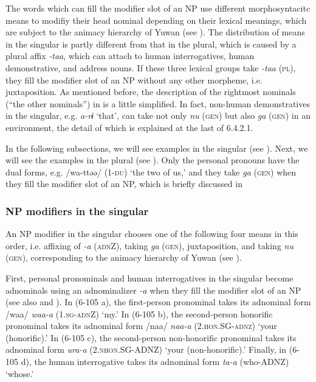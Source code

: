 The words which can fill the modifier slot of an NP use different morphosyntacitc means to modifiy their head nominal depending on their lexical meanings, which are subject to the animacy hierarchy of Yuwan (see ). The distribution of means in the singular is partly different from that in the plural, which is caused by a plural affix \textit{{}-taa}, which can attach to human interrogatives, human demonstrative, and address nouns. If these three lexical groups take \textit{{}-taa} (\textsc{pl}), they fill the modifier slot of an NP without any other morpheme, i.e. juxtaposition. As mentioned before, the description of the rightmost nominals (“the other nominals”) in  is a little simplified. In fact, non-human demonstratives in the singular, e.g. \textit{a-rɨ} ‘that’, can take not only \textit{nu} (\textsc{gen}) but also \textit{ga} (\textsc{gen}) in an environment, the detail of which is explained at the last of 6.4.2.1.

In the following subsections, we will see examples in the singular (see ). Next, we will see the examples in the plural (see ). Only the personal pronouns have the dual forms, e.g. /wa-ttəə/ (1-\textsc{du}) ‘the two of us,’ and they take \textit{ga} (\textsc{gen}) when they fill the modifier slot of an NP, which is briefly discussed in 

\subsubsection{NP modifiers in the singular}

An NP modifier in the singular chooses one of the following four means in this order, i.e. affixing of \textit{{}-a} (\textsc{adn}Z), taking \textit{ga} (\textsc{gen}), juxtaposition, and taking \textit{nu} (\textsc{gen}), corresponding to the animacy hierarchy of Yuwan (see ).

First, personal pronominals and human interrogatives in the singular become adnominals using an adnominalizer \textit{{}-a} when they fill the modifier slot of an NP (see also  and ). In (6-105 a), the first-person pronominal takes its adnominal form /waa/ \textit{waa-a} (1.\textsc{sg}-\textsc{adn}Z) ‘my.’ In (6-105 b), the second-person honorific pronominal takes its adnominal form /naa/ \textit{naa-a} (2.\textsc{hon}.SG-\textsc{adnz}) ‘your (honorific).’ In (6-105 c), the second-person non-honorific pronominal takes its adnominal form \textit{ura-a} (2.\textsc{nhon}.SG-ADNZ) ‘your (non-honorific).’ Finally, in (6-105 d), the human interrogative takes its adnominal form \textit{ta-a} (who-ADNZ) ‘whose.’

